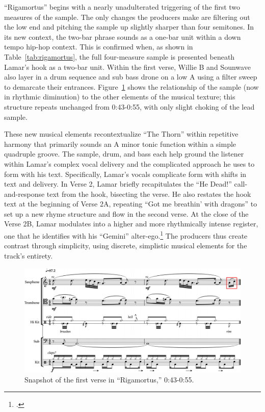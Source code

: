 ``Rigamortus'' begins with a nearly unadulterated triggering of the first two measures of the sample.
The only changes the producers make are filtering out the low end and pitching the sample up slightly 
sharper than four semitones. In its new context, the two-bar phrase sounds as a one-bar unit within a 
down tempo hip-hop context. This is confirmed when, as shown in Table~\ref{tab:rigamortus}, the full
four-measure sample is presented beneath Lamar's hook as a two-bar unit. Within the first verse, Willie B
and Sounwave also layer in a drum sequence and sub bass drone on a low A using a filter sweep to demarcate
their entrances. Figure~\ref{fig:rigamortusnoslip} shows the relationship of the sample (now in rhythmic
diminution) to the other elements of the musical texture; this structure repeats unchanged from 0:43-0:55,
with only slight choking of the lead sample.

These new musical elements recontextualize ``The Thorn'' within repetitive harmony that primarily 
sounds an A minor tonic function within a simple quadruple groove. The sample, drum, and bass each 
help ground the listener within Lamar's complex vocal delivery and the complicated approach he uses 
to form with his text. Specifically, Lamar's vocals complicate form with shifts in text and delivery. 
In Verse 2, Lamar briefly recapitulates the ``He Dead!'' call-and-response text from the hook, bisecting
the verse. He also restates the hook text at the beginning of Verse 2A, repeating ``Got me breathin' 
with dragons'' to set up a new rhyme structure and flow in the second verse. At the close of the Verse
2B, Lamar modulates into a higher and more rhythmically intense register, one that he identifies with 
his ``Gemini'' alter-ego.\footnote{\cite{chrismenchTrackingManyVoices2017}.} The producers thus create
contrast through simplicity, using discrete, simplistic musical elements for the track's entirety.

\begin{figure}[ht]
    \centering
    \includegraphics[width=\textwidth]{images/figures/chp 02/043053rigamortusnoslip.pdf}
    \caption{Snapshot of the first verse in ``Rigamortus,'' 0:43-0:55.}
    \label{fig:rigamortusnoslip}
\end{figure}


